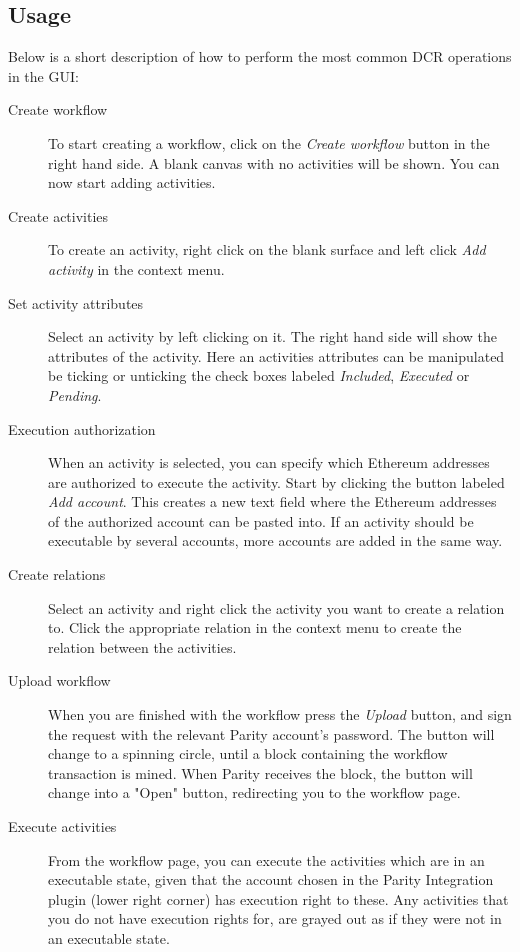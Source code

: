 \documentclass{article}
\begin{document}
		\subsection{Usage}
		Below is a short description of how to perform the most common DCR operations in the GUI:
		\begin{description}
			\item[Create workflow] To start creating a workflow, click on the \emph{Create workflow} button in the right hand side.
			 A blank canvas with no activities will be shown.
			 You can now start adding activities.
			\item[Create activities] To create an activity, right click on the blank surface and left click \emph{Add activity} in the context menu.
			\item[Set activity attributes] Select an activity by left clicking on it.
			 The right hand side will show the attributes of the activity.
			 Here an activities attributes can be manipulated be ticking or unticking the check boxes labeled \emph{Included}, \emph{Executed} or \emph{Pending}.
			\item[Execution authorization] When an activity is selected, you can specify which Ethereum addresses are authorized to execute the activity.
			 Start by clicking the button labeled \emph{Add account}.
			 This creates a new text field where the Ethereum addresses of the authorized account can be pasted into.
			 If an activity should be executable by several accounts, more accounts are added in the same way.
			\item[Create relations] Select an activity and right click the activity you want to create a relation to.
			 Click the appropriate relation in the context menu to create the relation between the activities.
			\item[Upload workflow] When you are finished with the workflow press the \emph{Upload} button, and sign the request with the relevant Parity account's password.
			 The button will change to a spinning circle, until a block containing the workflow transaction is mined.
			 When Parity receives the block, the button will change into a "Open" button, redirecting you to the workflow page. 


			\item[Execute activities] From the workflow page, you can execute the activities which are in an executable state, given that the account chosen in the Parity Integration plugin (lower right corner) has execution right to these.
			Any activities that you do not have execution rights for, are grayed out as if they were not in an executable state.   
		\end{description}
\end{document}
